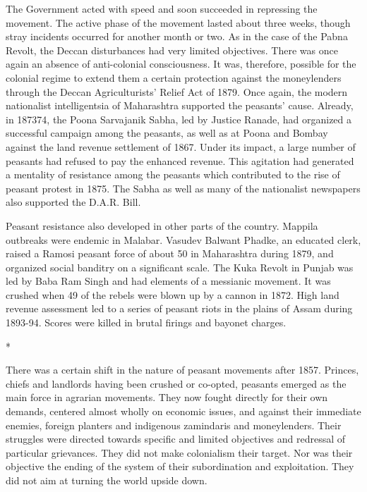 The Government acted with speed and soon succeeded in repressing the movement. The active phase of the movement lasted about three weeks, though stray incidents occurred for another month or two. As in the case of the Pabna Revolt, the Deccan disturbances had very limited objectives. There was once again an absence of anti-colonial consciousness. It was, therefore, possible for the colonial regime to extend them a certain protection against the moneylenders through the Deccan Agriculturists’ Relief Act of 1879. Once again, the modern nationalist intelligentsia of Maharashtra supported the peasants’ cause. Already, in 1873­74, the Poona Sarvajanik Sabha, led by Justice Ranade, had organized a successful campaign among the peasants, as well as at Poona and Bombay against the land revenue settlement of 1867. Under its impact, a large number of peasants had refused to pay the enhanced revenue. This agitation had generated a mentality of resistance among the peasants which contributed to the rise of peasant protest in 1875. The Sabha as well as many of the nationalist newspapers also supported the D.A.R. Bill.

Peasant resistance also developed in other parts of the country. Mappila outbreaks were endemic in Malabar. Vasudev Balwant Phadke, an educated clerk, raised a Ramosi peasant force of about 50 in Maharashtra during 1879, and organized social banditry on a significant scale. The Kuka Revolt in Punjab was led by Baba Ram Singh and had elements of a messianic movement. It was crushed when 49 of the rebels were blown up by a cannon in 1872. High land revenue assessment led to a series of peasant riots in the plains of Assam during 1893-94. Scores were killed in brutal firings and bayonet charges.

\begin{center}*\end{center}

There was a certain shift in the nature of peasant movements after 1857. Princes, chiefs and landlords having been crushed or co-opted, peasants emerged as the main force in agrarian movements. They now fought directly for their own demands, centered almost wholly on economic issues, and against their immediate enemies, foreign planters and indigenous zamindaris and moneylenders. Their struggles were directed towards specific and limited objectives and redressal of particular grievances. They did not make colonialism their target. Nor was their objective the ending of the system of their subordination and exploitation. They did not aim at turning the world upside down.

